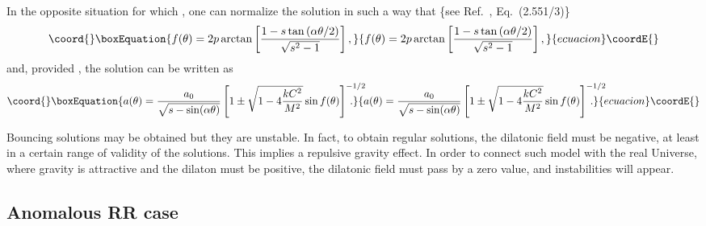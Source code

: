 \documentclass[a4paper,aps,twocolumn,prd,showpacs,nofootinbib]{revtex4}
\begin{document}
In the opposite situation for which \coordHE{}, one can normalize the
solution in such a way that \{see Ref.~\cite{Grad}, Eq.~(2.551/3)\}
\begin{equation}\coord{}\boxEquation{
f(\theta) = 2 p \arctan \left[
{1-s\tan\left(\alpha\theta/2\right)\over \sqrt{s^2-1} }\right],
}{
f(\theta) = 2 p \arctan \left[
{1-s\tan\left(\alpha\theta/2\right)\over \sqrt{s^2-1} }\right],
}{ecuacion}\coordE{}\end{equation}
and, provided \coordHE{}, the solution can be written as
\begin{equation}\coord{}\boxEquation{
a(\theta) = \frac{a_0}{\sqrt{s - \sin(\alpha\theta)}}\left[1 \pm
\sqrt{1 - 4\displaystyle{\frac{kC^2}{M^2}}}\sin
f(\theta)\right]^{-1/2} \!\!\!\!\!\!\!\!\!\!.
}{
a(\theta) = \frac{a_0}{\sqrt{s - \sin(\alpha\theta)}}\left[1 \pm
\sqrt{1 - 4\displaystyle{\frac{kC^2}{M^2}}}\sin
f(\theta)\right]^{-1/2} \!\!\!\!\!\!\!\!\!\!.
}{ecuacion}\coordE{}\end{equation}

Bouncing solutions may be obtained but they are unstable. In fact, to
obtain regular solutions, the dilatonic field must be negative, at
least in a certain range of validity of the solutions. This implies a
repulsive gravity effect. In order to connect such model with the real
Universe, where gravity is attractive and the dilaton must be
positive, the dilatonic field must pass by a zero value, and
instabilities will appear.

\subsection{Anomalous RR case}
\end{document}

